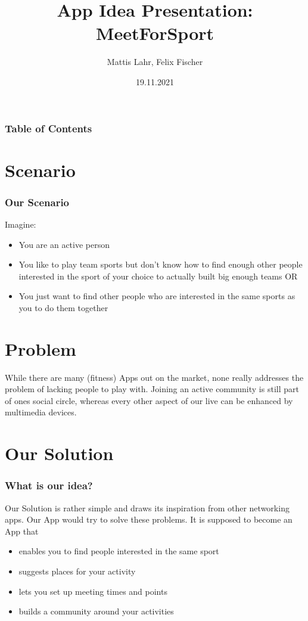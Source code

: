 \documentclass[aspectratio=169]{beamer}
\title{App Idea Presentation: MeetForSport}
\author{Mattis Lahr, Felix Fischer}
\date{19.11.2021}
\begin{document}
\maketitle



\begin{frame}
    \frametitle{Table of Contents}
    \tableofcontents
\end{frame}





\section{Scenario}
\begin{frame}   
\frametitle{Our Scenario}
Imagine:
    \begin{itemize}	
	 	\item You are an active person
	 	\item You like to play team sports but don’t know how to find enough other people interested in the sport of your choice to actually built big enough teams OR
	 	\item You just want to find other people who are interested in the same sports as you to do them together
    \end{itemize}
\end{frame}


\section{Problem}
\begin{frame}   
	While there are many (fitness) Apps out on the market, none really
	addresses the problem of lacking people to play with. Joining an active
	community is still part of ones social circle, whereas every other aspect of
	our live can be enhanced by multimedia devices.
	\end{frame}


\section{Our Solution}
\begin{frame}   
\frametitle{What is our idea?}
Our Solution is rather simple and draws its inspiration from other networking apps.
Our App would try to solve these problems. It is supposed to become an App that
    \begin{itemize}	
		\item enables you to find people interested in the same sport
	 	\item suggests places for your activity 
	 	\item lets you set up meeting times and points
	 	\item builds a community around your activities 
    \end{itemize}
\end{frame}
\end{document}
